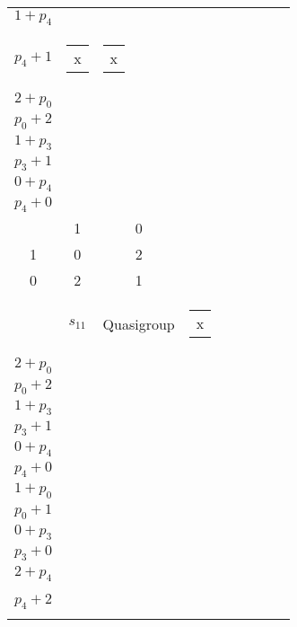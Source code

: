 \begin{longtable}{|c|c|c|c|c|c|c|c|c|}
\begin{tabular}{@{}c@{}}
    \( p_{3} + 2 \)\\\hline
    \( 1 + p_{4} \)\\\hline
    \( p_{4} + 1 \)
\end{tabular} & \begin{tabular}{@{}c@{}}
    x
\end{tabular} & \begin{tabular}{@{}c@{}}
    x
\end{tabular} & \begin{tabular}{@{}c@{}}
    \\\hline
    \( 2 + p_{0} \)\\\hline
    \( p_{0} + 2 \)\\\hline
    \( 1 + p_{3} \)\\\hline
    \( p_{3} + 1 \)\\\hline
    \( 0 + p_{4} \)\\\hline
    \( p_{4} + 0 \)
\end{tabular}\\\hline
    \( \begin{smallmatrix}
    2 & 1 & 0\\
    1 & 0 & 2\\
    0 & 2 & 1\\
\end{smallmatrix} \) & \( s_{11} \) & Quasigroup & \begin{tabular}{@{}c@{}}
    x
\end{tabular} & \begin{tabular}{@{}c@{}}
    \\\hline
    \( 2 + p_{0} \)\\\hline
    \( p_{0} + 2 \)\\\hline
    \( 1 + p_{3} \)\\\hline
    \( p_{3} + 1 \)\\\hline
    \( 0 + p_{4} \)\\\hline
    \( p_{4} + 0 \)
\end{tabular} & \begin{tabular}{@{}c@{}}
    \\\hline
    \( 1 + p_{0} \)\\\hline
    \( p_{0} + 1 \)\\\hline
    \( 0 + p_{3} \)\\\hline
    \( p_{3} + 0 \)\\\hline
    \( 2 + p_{4} \)\\\hline
    \( p_{4} + 2 \)
\end{tabular} & \begin{tabular}{@{}c@{}}

\end{tabular}
\end{longtable}
